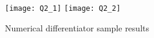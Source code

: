 \documentclass{article}
\newcommand{\<}[1]{\left\langle #1 \right\rangle }
\begin{document}
\begin{figure}[h]
	\caption{Numerical differentiator sample results}
	\texttt{[image: Q2\_1]}
	\texttt{[image: Q2\_2]} 
\end{figure}

\newpage
\section{}
\end{document}
